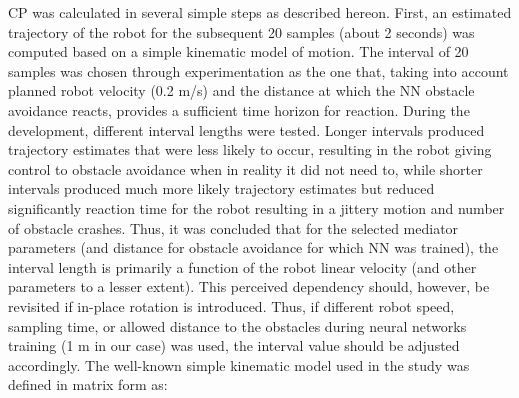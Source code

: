 CP was calculated in several simple steps as described hereon. First, an estimated trajectory of the robot for the subsequent 20 samples (about 2 seconds) was computed based on a simple kinematic model of motion. The interval of 20 samples was chosen through experimentation as the one that, taking into account planned robot velocity (0.2 m/s) and the distance at which the NN obstacle avoidance reacts, provides a sufficient time horizon for reaction. During the development, different interval lengths were tested. Longer intervals produced trajectory estimates that were less likely to occur, resulting in the robot giving control to obstacle avoidance when in reality it did not need to, while shorter intervals produced much more likely trajectory estimates but reduced significantly reaction time for the robot resulting in a jittery motion and number of obstacle crashes. Thus, it was concluded that for the selected mediator parameters (and distance for obstacle avoidance for which NN was trained), the interval length is primarily a function of the robot linear velocity (and other parameters to a lesser extent). This perceived dependency should, however, be revisited if in-place rotation is introduced. Thus, if different robot speed, sampling time, or allowed distance to the obstacles during neural networks training (1 m in our case) was used, the interval value should be adjusted accordingly.
The well-known simple kinematic model used in the study was defined in matrix form as:

